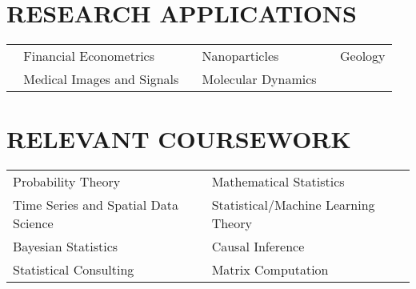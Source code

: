 \documentclass[pdftex,11pt]{article}	%
\begin{document}
\section*{RESEARCH APPLICATIONS}

\begin{tabularx}{\textwidth}{@{} X X X @{}}
	\textbullet ~ Financial Econometrics & \textbullet ~ Nanoparticles & \textbullet ~ Geology \\
	\textbullet  ~ Medical Images and Signals & \textbullet ~ Molecular Dynamics & \\
\end{tabularx}

\section*{RELEVANT COURSEWORK}
\begin{tabularx}{\textwidth}{@{} X X @{}}
	Probability Theory & Mathematical Statistics \\
	Time Series and Spatial Data Science & Statistical/Machine Learning Theory \\
	Bayesian Statistics & Causal Inference \\
	Statistical Consulting & Matrix Computation
\end{tabularx}
\fi
\end{document}
